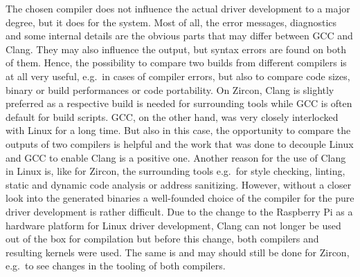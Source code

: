 The chosen compiler does not influence the actual driver development to a major degree, but it does for the system.
Most of all, the error messages, diagnostics and some internal details are the obvious parts that may differ between GCC and Clang.
They may also influence the output, but syntax errors are found on both of them.
Hence, the possibility to compare two builds from different compilers is at all very useful, e.g.\ in cases of compiler errors, but also to compare code sizes, binary or build performances or code portability.
On Zircon, Clang is slightly preferred as a respective build is needed for surrounding tools while GCC is often default for build scripts.
GCC, on the other hand, was very closely interlocked with Linux for a long time.
But also in this case, the opportunity to compare the outputs of two compilers is helpful and the work that was done to decouple Linux and GCC to enable Clang is a positive one.
Another reason for the use of Clang in Linux is, like for Zircon, the surrounding tools e.g.\ for style checking, linting, static and dynamic code analysis or address sanitizing\cite{linux-llvm}.
However, without a closer look into the generated binaries a well-founded choice of the compiler for the pure driver development is rather difficult.
Due to the change to the Raspberry Pi as a hardware platform for Linux driver development, Clang can not longer be used out of the box for compilation but before this change, both compilers and resulting kernels were used.
The same is and may should still be done for Zircon, e.g.\ to see changes in the tooling of both compilers.

